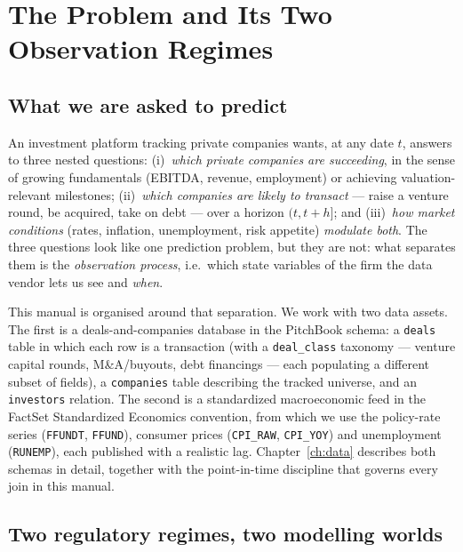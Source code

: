 \chapter{The Problem and Its Two Observation Regimes}
\label{ch:problem}

\section{What we are asked to predict}

An investment platform tracking private companies wants, at any date $t$, answers to three
nested questions:
(i)~\emph{which private companies are succeeding}, in the sense of growing fundamentals
(EBITDA, revenue, employment) or achieving valuation-relevant milestones;
(ii)~\emph{which companies are likely to transact} --- raise a venture round, be acquired,
take on debt --- over a horizon $(t, t+h]$; and
(iii)~\emph{how market conditions} (rates, inflation, unemployment, risk appetite)
\emph{modulate both}. The three questions look like one prediction problem, but they are
not: what separates them is the \emph{observation process}, i.e.\ which state variables of
the firm the data vendor lets us see and \emph{when}.

This manual is organised around that separation. We work with two data assets. The first
is a deals-and-companies database in the PitchBook schema: a \texttt{deals} table in which
each row is a transaction (with a \texttt{deal\_class} taxonomy --- venture capital rounds,
M\&A/buyouts, debt financings --- each populating a different subset of fields), a
\texttt{companies} table describing the tracked universe, and an \texttt{investors}
relation. The second is a standardized macroeconomic feed in the FactSet Standardized
Economics convention, from which we use the policy-rate series (\texttt{FFUNDT},
\texttt{FFUND}), consumer prices (\texttt{CPI\_RAW}, \texttt{CPI\_YOY}) and unemployment
(\texttt{RUNEMP}), each published with a realistic lag. Chapter~\ref{ch:data} describes
both schemas in detail, together with the point-in-time discipline that governs every join
in this manual.

\section{Two regulatory regimes, two modelling worlds}

